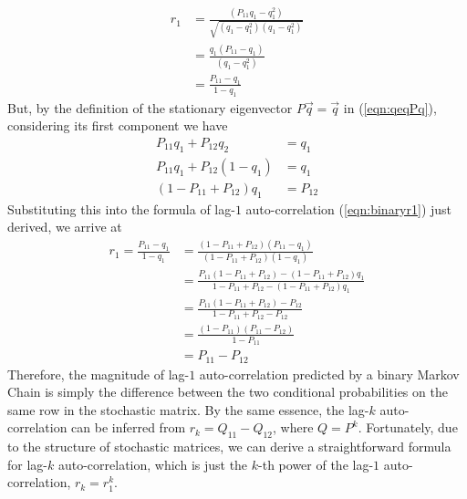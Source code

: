 \begin{align}
r_1 &= \frac{(P_{11}q_1-q_1^2)}{\sqrt{(q_1-q_1^2)(q_1-q_1^2)}} \nonumber \\
&= \frac{q_1(P_{11}-q_1)}{(q_1-q_1^2)} \nonumber \\
&= \frac{P_{11}-q_1}{1-q_1} \label{eqn:binaryr1}
\end{align}
But, by the definition of the stationary eigenvector $P\vec{q} = \vec{q}$ in (\ref{eqn:qeqPq}), considering its first component we have
\begin{align}
P_{11}q_1 + P_{12}q_2 &= q_1  \nonumber \\
P_{11}q_1 + P_{12}(1-q_1) &= q_1 \nonumber  \\
(1 - P_{11} + P_{12}) q_1 &= P_{12}
\end{align}
Substituting this into the formula of lag-$1$ auto-correlation (\ref{eqn:binaryr1}) just derived, we arrive at
\begin{align}
r_1 = \frac{P_{11}-q_1}{1-q_1} &= \frac{(1 - P_{11} + P_{12})(P_{11}-q_1)}{(1 - P_{11} + P_{12})(1-q_1)}  \nonumber \\
&= \frac{P_{11}(1 - P_{11} + P_{12}) - (1 - P_{11} + P_{12})q_1}{1 - P_{11} + P_{12} - (1 - P_{11} + P_{12})q_1}  \nonumber \\
&= \frac{P_{11}(1 - P_{11} + P_{12}) - P_{12}}{1 - P_{11} + P_{12} - P_{12}} \nonumber  \\
&= \frac{(1-P_{11})(P_{11}-P_{12})}{1 - P_{11}} \nonumber  \\
&= P_{11} - P_{12}
\end{align}
Therefore, the magnitude of lag-$1$ auto-correlation predicted by a binary Markov Chain is simply the difference between the two conditional probabilities on the same row in the stochastic matrix. By the same essence, the lag-$k$ auto-correlation can be inferred from $r_k = Q_{11} - Q_{12}$, where $Q = P^k$. Fortunately, due to the structure of stochastic matrices, we can derive a straightforward formula for lag-$k$ auto-correlation, which is just the $k$-th power of the lag-$1$ auto-correlation, $r_k = r_1^k$.

